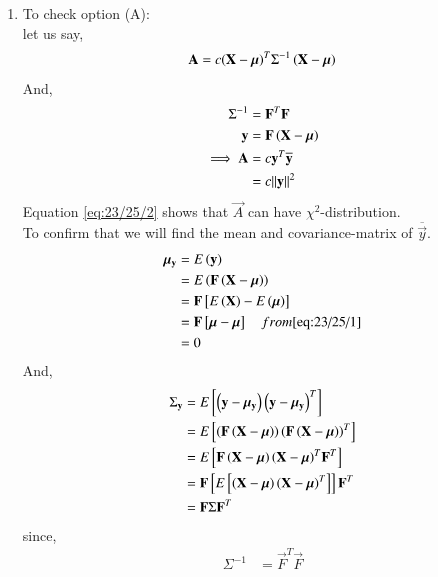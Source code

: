 \documentclass[journal,12pt,onecolumn]{IEEEtran}
\theoremstyle{remark}
\begin{document}
\begin{enumerate}[label=(\alph*)]
\item To check option (A): \\
let us say,
\begin{align}
\mathbf{A} &= c{\left(\mathbf{X}-\bm{\mu}\right)}^T{\Sigma}^{-1}\left(\mathbf{X}-\bm{\mu}\right) \\
\end{align}
And,
\begin{align}
{\Sigma}^{-1} &= {\vec{F}}^T\vec{F} \label{eq:23/25/3} \\
\vec{y} &= \vec{F}\brak{\vec{X}-\bm{\mu}} \\
\implies \vec{A} &= c{\vec{y}}^T\overline{\vec{y}} \\
                 &= c{\norm{\vec{y}}}^2  \label{eq:23/25/2}
\end{align}
Equation \eqref{eq:23/25/2} shows that $\vec{A}$ can have ${\chi}^2$-distribution. \\
To confirm that we will find the mean and covariance-matrix of $\overline{\vec{y}}$.
\begin{align}
{\bm{\mu}}_{\mathbf{y}} &= E\left(\mathbf{y}\right) \\
                           &= E\left(\mathbf{F}\left(\mathbf{X}-\bm{\mu}\right)\right) \\
                           &= \mathbf{F}{}\left[E\left(\mathbf{X}\right)-E\left(\bm{\mu}\right)\right] \\
                           &= \mathbf{F}{}\left[\bm{\mu}-\bm{\mu}\right] \quad from \eqref{eq:23/25/1} \\
                           &= 0 
\end{align}
And,
\begin{align}
{\Sigma}_{\mathbf{y}} &= E{}\left[\left(\mathbf{y}-{\bm{\mu}}_{\mathbf{y}}\right){\left(\mathbf{y}-{\bm{\mu}}_{\mathbf{y}}\right)}^T\right] \\
                              &= E{}\left[\left(\mathbf{F}\left(\mathbf{X}-\bm{\mu}\right)\right){\left(\mathbf{F}\left(\mathbf{X}-\bm{\mu}\right)\right)}^T\right] \\
                              &= E{}\left[\mathbf{F}\left(\mathbf{X}-\bm{\mu}\right){\left(\mathbf{X}-\bm{\mu}\right)}^T{\mathbf{F}}^T\right] \\
                              &= \mathbf{F}{}\left[E{}\left[\left(\mathbf{X}-\bm{\mu}\right){\left(\mathbf{X}-\bm{\mu}\right)}^T\right]\right]{\mathbf{F}}^T \\
                              &= \mathbf{F} \Sigma {\mathbf{F}}^T 
\end{align}
since,
\begin{align}
{\Sigma}^{-1} &= {\vec{F}}^T\vec{F} \\

\end{align}
\end{enumerate}
\end{document}
